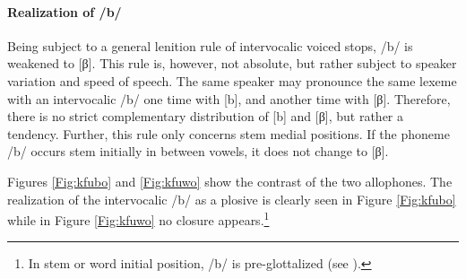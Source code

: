 


\paragraph{Realization of /b/} Being subject to a general lenition rule of intervocalic voiced stops, /b/ is weakened to [β]. This rule is, however, not absolute, but rather subject to speaker variation and speed of speech. The same speaker may pronounce the same lexeme with an intervocalic /b/ one time with [b], and another time with [β]. Therefore, there is no strict complementary distribution of [b] and [β], but rather a tendency. Further, this rule only concerns stem medial positions. If the phoneme /b/ occurs stem initially in between vowels, it does not change to [β].

Figures \ref{Fig:kfubo} and \ref{Fig:kfuwo} show the contrast of the two allophones. The realization of the intervocalic /b/ as a plosive is clearly seen in Figure \ref{Fig:kfubo} while in Figure \ref{Fig:kfuwo} no closure appears.\footnote{In stem or word initial position, /b/ is pre-glottalized (see ).}


